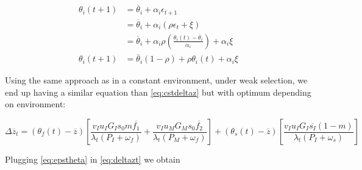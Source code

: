 \begin{align}
	\theta_{i}(t+1) &= \overline{\theta}_{i} + \alpha_{i}\epsilon_{t+1} \nonumber \\
	&= \overline{\theta}_{i} + \alpha_{i}(\rho\epsilon_{t} + \xi) \nonumber \\
	&= \overline{\theta}_{i} + \alpha_{i}\rho(\frac{\theta_{i}(t)-\overline{\theta}_{i}}{\alpha_{i}}) + \alpha_{i}\xi \nonumber \\
	\label{eq:thetait}
	\theta_{i}(t+1) &= \overline{\theta}_{i}(1-\rho) + \rho\theta_{i}(t) + \alpha_{i}\xi
\end{align}

Using the same approach as in a constant environment, under weak selection, we end up having a similar equation than \eqref{eq:cstdeltaz} but with optimum depending on environment:

\begin{equation}
	\label{eq:deltazt}
	\Delta\overline{z}_{t} = 
		(\theta_{f}(t) - \overline{z})
		\left[ \frac{ v_{I} u_{I} G_{I} s_{0} m \overline{f_{1}} }{ \lambda_{t} (P_{I}+\omega_{f}) }
			+ \frac{ v_{I} u_{M} G_{M} s_{0} \overline{f_{2}} }{ \lambda_{t} (P_{M} + \omega_{f}) }
		\right]
		+ (\theta_{s}(t) - \overline{z})
		\left[ \frac{ v_{I} u_{I} G_{I} \overline{s_{I}} (1-m) }{ \lambda_{t} (P_{I}+\omega_{s}) }
		\right]
\end{equation}

Plugging \eqref{eq:epstheta} in \eqref{eq:deltazt} we obtain

